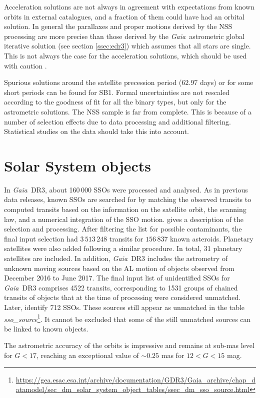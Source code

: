 \documentclass[longauth]{aa}
\makeatletter
\providecommand\gmag{\ensuremath{G}\xspace}
\newcommand\gaia{\textit{Gaia}\xspace}
\providecommand\gdrthree{\textit{Gaia}~DR3\xspace}
\providecommand{\linktodoc}{https://gea.esac.esa.int/archive/documentation/GDR3}
\providecommand{\ssotable}[1]{\url{\linktodoc/Gaia_archive/chap_datamodel/sec_dm_solar_system_object_tables/ssec_dm_#1.html}} %
\DeclareRobustCommand*{\fieldName}[1]{%
  \begingroup\@fieldName\scantokens{\texttt{\small {#1}}\noexpand}\endgroup}
\makeatother
\begin{document}
Acceleration solutions are not always in agreement with expectations from known orbits in external catalogues, and a fraction of them could have had an orbital solution. In general the parallaxes and proper motions derived by the NSS processing are more precise than those derived by the \gaia\ astrometric global iterative solution (see section \ref{ssec:edr3}) which assumes that all stars are single. This is not always the case for the acceleration solutions, which should be used with caution \citep{DR3-DPACP-100, DR3-DPACP-127}.

Spurious solutions around the satellite precession period ($62.97$ days) or for some short periods can be found for SB1. Formal uncertainties are not rescaled according to the goodness of fit for all the binary types, but only for the astrometric solutions. The NSS sample is far from complete. This is because of  a number of selection effects due to data processing and additional filtering. Statistical studies on the data  should take this into account.

\section{Solar System objects}\label{ssec:solar}

In \gdrthree, about 160\,000 SSOs were processed and analysed. As in previous data releases, known SSOs are searched for by matching the observed transits  to computed transits based on  the information on the satellite orbit, the scanning law, and a numerical integration of the SSO motion. \cite{DR3-DPACP-150} gives  a  description of the selection and processing. After filtering the list for possible contaminants, the final input selection had $3\,513\,248$ transits for $156\,837$ known asteroids. Planetary satellites were also added following a  similar procedure. In total, 31 planetary satellites are included. In addition, \gdrthree includes  the astrometry of  unknown moving sources based on the AL motion of objects observed from December 2016 to June 2017. The final input list of unidentified SSOs for \gdrthree  comprises 4522 transits, corresponding to 1531 groups of chained transits of objects that at the time of processing were considered  unmatched. Later, \citet{DR3-DPACP-150} identify  712 SSOs. These sources still appear as unmatched in the table \textit{sso\_source}\footnote{\ssotable{sso_source}}. It cannot be excluded that some of the still unmatched sources can be linked to known objects.

The astrometric accuracy of the orbits is impressive and remains at sub-mas  level for $\gmag<17$, reaching an exceptional value of $\sim0.25$ mas for  $12<$\gmag$<15$ mag.
\end{document}
